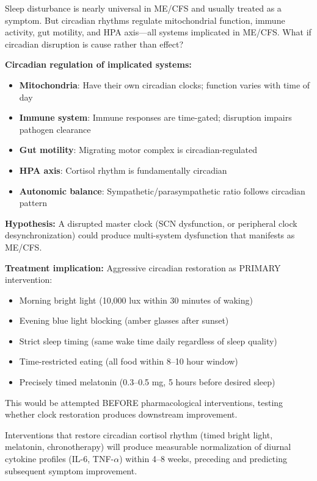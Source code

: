 \begin{hypothesis}
\label{hyp:circadian-core}
Sleep disturbance is nearly universal in ME/CFS and usually treated as a symptom. But circadian rhythms regulate mitochondrial function, immune activity, gut motility, and HPA axis---all systems implicated in ME/CFS. What if circadian disruption is cause rather than effect?

\textbf{Circadian regulation of implicated systems:}
\begin{itemize}
    \item \textbf{Mitochondria}: Have their own circadian clocks; function varies with time of day
    \item \textbf{Immune system}: Immune responses are time-gated; disruption impairs pathogen clearance
    \item \textbf{Gut motility}: Migrating motor complex is circadian-regulated
    \item \textbf{HPA axis}: Cortisol rhythm is fundamentally circadian
    \item \textbf{Autonomic balance}: Sympathetic/parasympathetic ratio follows circadian pattern
\end{itemize}

\textbf{Hypothesis:} A disrupted master clock (SCN dysfunction, or peripheral clock desynchronization) could produce multi-system dysfunction that manifests as ME/CFS.

\textbf{Treatment implication:} Aggressive circadian restoration as PRIMARY intervention:
\begin{itemize}
    \item Morning bright light (10,000 lux within 30 minutes of waking)
    \item Evening blue light blocking (amber glasses after sunset)
    \item Strict sleep timing (same wake time daily regardless of sleep quality)
    \item Time-restricted eating (all food within 8--10 hour window)
    \item Precisely timed melatonin (0.3--0.5 mg, 5 hours before desired sleep)
\end{itemize}

This would be attempted BEFORE pharmacological interventions, testing whether clock restoration produces downstream improvement.
\end{hypothesis}

\begin{prediction}
\label{pred:circadian-core}
Interventions that restore circadian cortisol rhythm (timed bright light, melatonin, chronotherapy) will produce measurable normalization of diurnal cytokine profiles (IL-6, TNF-$\alpha$) within 4--8 weeks, preceding and predicting subsequent symptom improvement.
\end{prediction}

